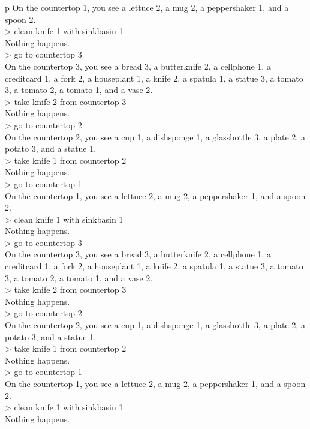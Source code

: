 \begin{table}[H]
\begin{minipage}{0.9\linewidth}
\begin{tabular}{p\linewidth}
On the countertop 1, you see a lettuce 2, a mug 2, a peppershaker 1, and a spoon 2. \\
> clean knife 1 with sinkbasin 1 \\
Nothing happens. \\
> go to countertop 3 \\
On the countertop 3, you see a bread 3, a butterknife 2, a cellphone 1, a creditcard 1, a fork 2, a houseplant 1, a knife 2, a spatula 1, a statue 3, a tomato 3, a tomato 2, a tomato 1, and a vase 2. \\
> take knife 2 from countertop 3 \\
Nothing happens. \\
> go to countertop 2 \\
On the countertop 2, you see a cup 1, a dishsponge 1, a glassbottle 3, a plate 2, a potato 3, and a statue 1. \\
> take knife 1 from countertop 2 \\
Nothing happens. \\
> go to countertop 1 \\
On the countertop 1, you see a lettuce 2, a mug 2, a peppershaker 1, and a spoon 2. \\
> clean knife 1 with sinkbasin 1 \\
Nothing happens. \\
> go to countertop 3 \\
On the countertop 3, you see a bread 3, a butterknife 2, a cellphone 1, a creditcard 1, a fork 2, a houseplant 1, a knife 2, a spatula 1, a statue 3, a tomato 3, a tomato 2, a tomato 1, and a vase 2. \\
> take knife 2 from countertop 3 \\
Nothing happens. \\
> go to countertop 2 \\
On the countertop 2, you see a cup 1, a dishsponge 1, a glassbottle 3, a plate 2, a potato 3, and a statue 1. \\
> take knife 1 from countertop 2 \\
Nothing happens. \\
> go to countertop 1 \\
On the countertop 1, you see a lettuce 2, a mug 2, a peppershaker 1, and a spoon 2. \\
> clean knife 1 with sinkbasin 1 \\
Nothing happens. \\

\end{tabular}
\end{minipage}
\end{table}
